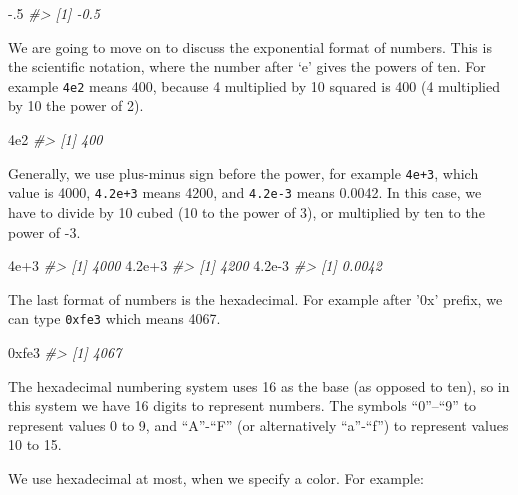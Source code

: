 \documentclass[
]{book}
\newenvironment{Shaded}{\begin{snugshade}}{\end{snugshade}}
\newcommand{\CommentTok}[1]{\textcolor[rgb]{0.56,0.35,0.01}{\textit{#1}}}
\newcommand{\DecValTok}[1]{\textcolor[rgb]{0.00,0.00,0.81}{#1}}
\newcommand{\FloatTok}[1]{\textcolor[rgb]{0.00,0.00,0.81}{#1}}
\newcommand{\NormalTok}[1]{#1}
\newcommand{\SpecialCharTok}[1]{\textcolor[rgb]{0.00,0.00,0.00}{#1}}
\begin{document}
\begin{Shaded}
\begin{Highlighting}[]
\SpecialCharTok{{-}}\NormalTok{.}\DecValTok{5}
\CommentTok{\#\textgreater{} [1] {-}0.5}
\end{Highlighting}
\end{Shaded}

We are going to move on to discuss the exponential format of numbers. This is the scientific notation, where the number after `e' gives the powers of ten. For example \texttt{4e2} means 400, because 4 multiplied by 10 squared is 400 (4 multiplied by 10 the power of 2).

\begin{Shaded}
\begin{Highlighting}[]
\FloatTok{4e2}
\CommentTok{\#\textgreater{} [1] 400}
\end{Highlighting}
\end{Shaded}

Generally, we use plus-minus sign before the power, for example \texttt{4e+3}, which value is 4000, \texttt{4.2e+3} means 4200, and \texttt{4.2e-3} means 0.0042. In this case, we have to divide by 10 cubed (10 to the power of 3), or multiplied by ten to the power of -3.

\begin{Shaded}
\begin{Highlighting}[]
\FloatTok{4e+3}
\CommentTok{\#\textgreater{} [1] 4000}
\FloatTok{4.2e+3}
\CommentTok{\#\textgreater{} [1] 4200}
\FloatTok{4.2e{-}3}
\CommentTok{\#\textgreater{} [1] 0.0042}
\end{Highlighting}
\end{Shaded}

The last format of numbers is the hexadecimal. For example after '0x' prefix, we can type \texttt{0xfe3} which means 4067.

\begin{Shaded}
\begin{Highlighting}[]
\DecValTok{0xfe3}
\CommentTok{\#\textgreater{} [1] 4067}
\end{Highlighting}
\end{Shaded}

The hexadecimal numbering system uses 16 as the base (as opposed to ten), so in this system we have 16 digits to represent numbers. The symbols ``0''--``9'' to represent values 0 to 9, and ``A''-``F'' (or alternatively ``a''-``f'') to represent values 10 to 15.

We use hexadecimal at most, when we specify a color. For example:
\end{document}
